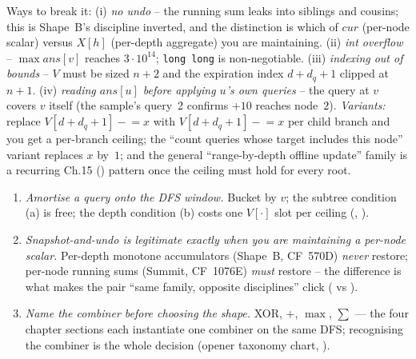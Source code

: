 \begin{warningbox}
Ways to break it: (i) \emph{no undo} -- the running sum leaks into
siblings and cousins; this is Shape~B's discipline inverted, and the
distinction is which of $\mathit{cur}$ (per-node scalar) versus
$\mathit{X}[h]$ (per-depth aggregate) you are maintaining. (ii)
\emph{int overflow} -- $\max \mathit{ans}[v]$ reaches $3\cdot 10^{14}$;
\lstinline{long long} is non-negotiable. (iii) \emph{indexing out of
bounds} -- $\mathit{V}$ must be sized $n+2$ and the expiration index
$d+d_q+1$ clipped at $n+1$. (iv) \emph{reading $\mathit{ans}[u]$ before
applying $u$'s own queries} -- the query at $v$ covers $v$ itself (the
sample's query~2 confirms $+10$ reaches node~$2$). \emph{Variants:}
replace $\mathit{V}[d+d_q+1] \mathrel{-}= x$ with $\mathit{V}[d + d_q + 1]
\mathrel{-}= x$ per child branch and you get a per-branch ceiling; the
``count queries whose target includes this node'' variant replaces $x$
by~$1$; and the general ``range-by-depth offline update'' family is a
recurring Ch.15 () pattern once the ceiling must hold for
every root.
\end{warningbox}

\begin{insightbox}
\begin{enumerate}[nosep, leftmargin=1.6em]
  \item \emph{Amortise a query onto the DFS window.} Bucket by $v$;
        the subtree condition (a) is free; the depth condition (b)
        costs one $\mathit{V}[\cdot]$ slot per ceiling
        (, ).
  \item \emph{Snapshot-and-undo is legitimate exactly when you are
        maintaining a per-node scalar.} Per-depth monotone accumulators
        (Shape~B, CF~570D) \emph{never} restore; per-node running sums
        (Summit, CF~1076E) \emph{must} restore -- the difference is
        what makes the pair ``same family, opposite disciplines'' click
        ( vs ).
  \item \emph{Name the combiner before choosing the shape.} XOR, $+$,
        $\max$, $\sum$ --- the four chapter sections each instantiate
        one combiner on the same DFS; recognising the combiner is the
        whole decision (opener taxonomy chart, ).
\end{enumerate}
\end{insightbox}

